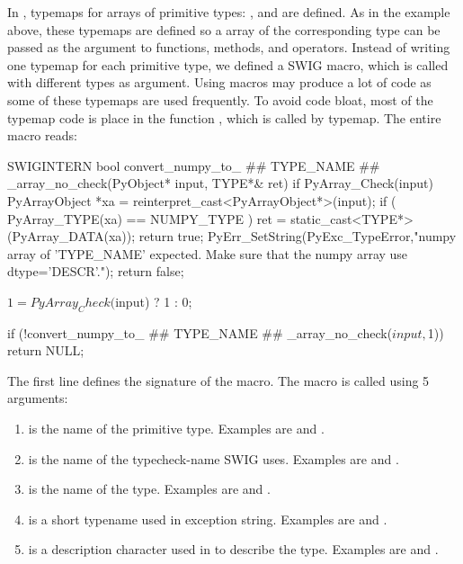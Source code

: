 In , typemaps for arrays of primitive types:
,  and  are defined. 
As in the  example above, these typemaps are defined so a \numpy
array of the corresponding type can be passed as the argument to functions,
methods, and operators. 
Instead of writing one typemap for each primitive type, we defined a SWIG
macro, which is called with different types as argument. Using macros may
produce a lot of code as some of these typemaps are used frequently. To
avoid code bloat, most of the typemap code is place in the function
, which is called
by typemap. The entire macro reads:
\begin{c++}
SWIGINTERN bool convert_numpy_to_ ## TYPE_NAME ## _array_no_check(PyObject* input, TYPE*& ret)
{
  if PyArray_Check(input)
  {
    PyArrayObject *xa = reinterpret_cast<PyArrayObject*>(input);
    if ( PyArray_TYPE(xa) == NUMPY_TYPE )
    {
      ret  = static_cast<TYPE*>(PyArray_DATA(xa));
      return true;
    }
  }
  PyErr_SetString(PyExc_TypeError,"numpy array of 'TYPE_NAME' expected. Make sure that the numpy array use dtype='DESCR'.");
  return false;
}

{
    $1 = PyArray_Check($input) ? 1 : 0;
}

{
if (!convert_numpy_to_ ## TYPE_NAME ## _array_no_check($input,$1))
    return NULL;
}

\end{c++}
The first line defines the signature of the macro. The macro is called using 5 arguments:
\begin{enumerate}
\item {} is the name of the primitive type. Examples are 
 and .
\item {} is the name of the typecheck-name SWIG uses. Examples
are  and .
\item {} is the name of the \numpy type. Examples are
 and .
\item {} is a short typename used in exception string.
Examples are  and .
\item {} is a description character used in \numpy to describe the
type. Examples are  and .
\end{enumerate}
